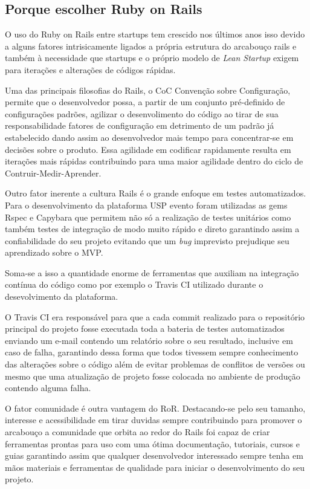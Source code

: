 \subsection{Porque escolher Ruby on Rails }
\par O uso do Ruby on Rails entre startups tem crescido  nos últimos anos isso devido a alguns fatores intrisicamente ligados a própria estrutura do arcabouço rails e também à necessidade que startups e o próprio modelo de \emph{Lean Startup} exigem para iterações e alterações de códigos rápidas.
\par Uma das principais filosofias do Rails, o CoC \- Convenção sobre Configuração, permite que o desenvolvedor possa, a partir de um conjunto pré-definido de configurações padrões, agilizar o desenvolimento do código ao tirar de sua responsabilidade fatores de configuração em detrimento de um padrão já estabelecido  dando assim ao desenvolvedor mais tempo para concentrar-se em decisões sobre o produto. Essa agilidade em codificar rapidamente resulta em iterações mais rápidas contribuindo para uma maior agilidade dentro do ciclo de Contruir-Medir-Aprender.
\par Outro fator inerente a cultura Rails é o grande enfoque em testes automatizados. Para o desenvolvimento da plataforma USP evento foram utilizadas as  gems Rspec e Capybara que permitem não só  a realização de testes unitários como também testes de integração de modo muito rápido e direto garantindo assim a confiabilidade  do seu projeto evitando que um \emph{bug} imprevisto prejudique seu aprendizado sobre o MVP. 
\par Soma-se a isso a quantidade enorme de ferramentas que auxiliam na integração contínua do código como por exemplo o Travis CI utilizado  durante o desevolvimento da plataforma. 
\par O Travis CI era responsável para que a cada commit realizado para o repositório principal do projeto fosse executada toda a bateria de testes automatizados enviando um e-mail contendo um relatório sobre o seu resultado, inclusive em caso de falha, garantindo dessa forma que todos tivessem sempre conhecimento das alterações sobre o código além de evitar  problemas de conflitos de versões ou mesmo que uma atualização de projeto fosse colocada no ambiente de produção contendo alguma falha.
\par O fator comunidade é outra vantagem do  RoR. Destacando-se pelo seu tamanho, interesse e acessibilidade em tirar duvidas sempre contribuindo para promover o arcabouço  a comunidade que orbita ao redor do Rails foi capaz de criar ferramentas prontas para uso com uma ótima documentação, tutoriais, cursos e guias garantindo assim que qualquer desenvolvedor interessado sempre tenha em mãos materiais e ferramentas de qualidade para iniciar o desenvolvimento do seu projeto.
